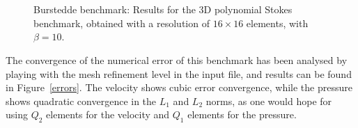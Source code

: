 \documentclass{article}
\begin{document}
\begin{figure}[t!]
  \centering
  ~ 
  \\
  ~
  \caption{Burstedde benchmark: Results for the 3D polynomial Stokes benchmark, obtained with a resolution of $16\times 16$ elements, with $\beta = 10$.}\label{fig:burstedde-benchmark}
\end{figure}

The convergence of the numerical error of this benchmark has been analysed by
playing with the mesh refinement level in the input file, and
results can be found in Figure~\ref{errors}. The velocity shows cubic error
convergence, while the pressure shows quadratic convergence in the $L_1$ and
$L_2$ norms, as one would hope for using $Q_2$ elements for the velocity and
$Q_1$ elements for the pressure.
\end{document}
